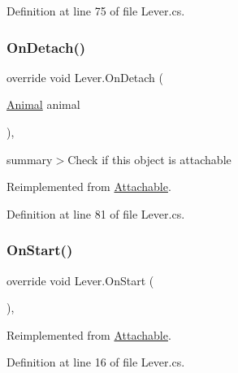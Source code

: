 Definition at line 75 of file Lever.\+cs.

\mbox{\label{class_lever_abe5f0492971af0f479a638b39ed6e9d9}} 
\subsubsection{\texorpdfstring{On\+Detach()}{OnDetach()}}
{\footnotesize\ttfamily override void Lever.\+On\+Detach (\begin{DoxyParamCaption}\item[{\mbox{\hyperlink{class_animal}{Animal}}}]{animal }\end{DoxyParamCaption})\hspace{0.3cm}{\ttfamily [protected]}, {\ttfamily [virtual]}}



summary$>$Check if this object is attachable



Reimplemented from \mbox{\hyperlink{class_attachable_abe7cf9d7930393610c7c9c4ae14b12d7}{Attachable}}.



Definition at line 81 of file Lever.\+cs.

\mbox{\label{class_lever_af2c615a25c4a7296e38f5120173347c9}} 
\subsubsection{\texorpdfstring{On\+Start()}{OnStart()}}
{\footnotesize\ttfamily override void Lever.\+On\+Start (\begin{DoxyParamCaption}{ }\end{DoxyParamCaption})\hspace{0.3cm}{\ttfamily [protected]}, {\ttfamily [virtual]}}



Reimplemented from \mbox{\hyperlink{class_attachable_a3c05c0b07b831881a7ab245057d34d30}{Attachable}}.



Definition at line 16 of file Lever.\+cs.

\mbox{\label{class_lever_a951c61f78d4f24b33d4ceb7ac3d53efb}} 
